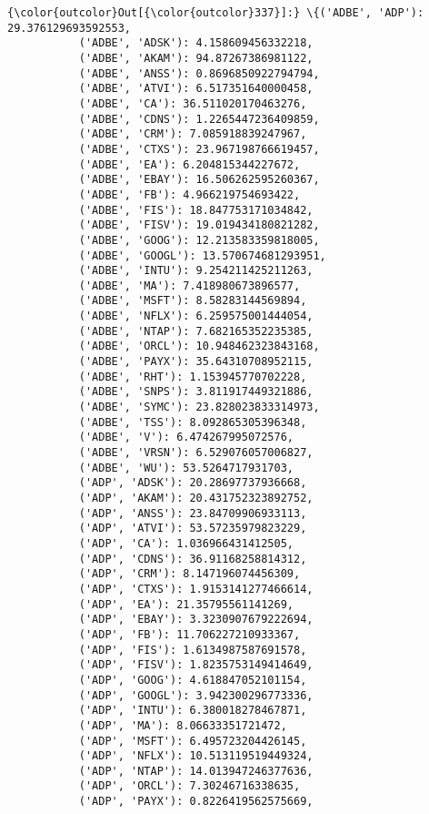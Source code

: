 \documentclass[11pt]{article}
\begin{document}
\begin{Verbatim}[commandchars=\\\{\}]
{\color{outcolor}Out[{\color{outcolor}337}]:} \{('ADBE', 'ADP'): 29.376129693592553,
           ('ADBE', 'ADSK'): 4.158609456332218,
           ('ADBE', 'AKAM'): 94.87267386981122,
           ('ADBE', 'ANSS'): 0.8696850922794794,
           ('ADBE', 'ATVI'): 6.517351640000458,
           ('ADBE', 'CA'): 36.511020170463276,
           ('ADBE', 'CDNS'): 1.2265447236409859,
           ('ADBE', 'CRM'): 7.085918839247967,
           ('ADBE', 'CTXS'): 23.967198766619457,
           ('ADBE', 'EA'): 6.204815344227672,
           ('ADBE', 'EBAY'): 16.506262595260367,
           ('ADBE', 'FB'): 4.966219754693422,
           ('ADBE', 'FIS'): 18.847753171034842,
           ('ADBE', 'FISV'): 19.019434180821282,
           ('ADBE', 'GOOG'): 12.213583359818005,
           ('ADBE', 'GOOGL'): 13.570674681293951,
           ('ADBE', 'INTU'): 9.254211425211263,
           ('ADBE', 'MA'): 7.418980673896577,
           ('ADBE', 'MSFT'): 8.58283144569894,
           ('ADBE', 'NFLX'): 6.259575001444054,
           ('ADBE', 'NTAP'): 7.682165352235385,
           ('ADBE', 'ORCL'): 10.948462323843168,
           ('ADBE', 'PAYX'): 35.64310708952115,
           ('ADBE', 'RHT'): 1.153945770702228,
           ('ADBE', 'SNPS'): 3.811917449321886,
           ('ADBE', 'SYMC'): 23.828023833314973,
           ('ADBE', 'TSS'): 8.092865305396348,
           ('ADBE', 'V'): 6.474267995072576,
           ('ADBE', 'VRSN'): 6.529076057006827,
           ('ADBE', 'WU'): 53.5264717931703,
           ('ADP', 'ADSK'): 20.28697737936668,
           ('ADP', 'AKAM'): 20.431752323892752,
           ('ADP', 'ANSS'): 23.84709906933113,
           ('ADP', 'ATVI'): 53.57235979823229,
           ('ADP', 'CA'): 1.036966431412505,
           ('ADP', 'CDNS'): 36.91168258814312,
           ('ADP', 'CRM'): 8.147196074456309,
           ('ADP', 'CTXS'): 1.9153141277466614,
           ('ADP', 'EA'): 21.35795561141269,
           ('ADP', 'EBAY'): 3.3230907679222694,
           ('ADP', 'FB'): 11.706227210933367,
           ('ADP', 'FIS'): 1.6134987587691578,
           ('ADP', 'FISV'): 1.8235753149414649,
           ('ADP', 'GOOG'): 4.618847052101154,
           ('ADP', 'GOOGL'): 3.942300296773336,
           ('ADP', 'INTU'): 6.380018278467871,
           ('ADP', 'MA'): 8.06633351721472,
           ('ADP', 'MSFT'): 6.495723204426145,
           ('ADP', 'NFLX'): 10.513119519449324,
           ('ADP', 'NTAP'): 14.013947246377636,
           ('ADP', 'ORCL'): 7.30246716338635,
           ('ADP', 'PAYX'): 0.8226419562575669,

\end{Verbatim}
\end{document}
